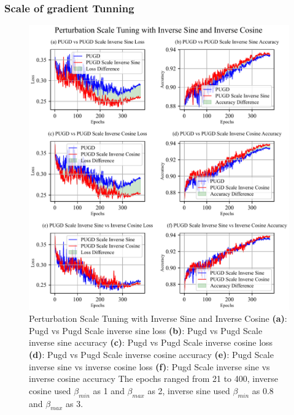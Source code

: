 \documentclass[10pt,twocolumn,letterpaper]{article}
\begin{document}
\subsubsection{Scale of gradient Tunning}
\label{subsec:4.1.3}

\begin{figure}[htbp]
	\center
	\vspace{-10pt} 
	\includegraphics[width=\columnwidth]{images/PUGDScaleInv.pdf}
	\caption{Perturbation Scale Tuning with Inverse Sine and Inverse Cosine
	\textbf{(a)}: Pugd vs Pugd Scale inverse sine loss \textbf{(b)}: Pugd vs Pugd Scale inverse sine accuracy
    \textbf{(c)}: Pugd vs Pugd Scale inverse cosine loss \textbf{(d)}: Pugd vs Pugd Scale inverse cosine accuracy
	\textbf{(e)}: Pugd Scale inverse sine vs inverse cosine loss \textbf{(f)}: Pugd Scale inverse sine vs inverse cosine accuracy
	The epochs ranged from 21 to 400, inverse cosine used $\beta_{min}$ as 1 and $\beta_{max}$ as 2, inverse sine used $\beta_{min}$ as 0.8 and $\beta_{max}$ as 3.
	}
	\label{fig:PUGDScaleInv}
\end{figure}
\end{document}
